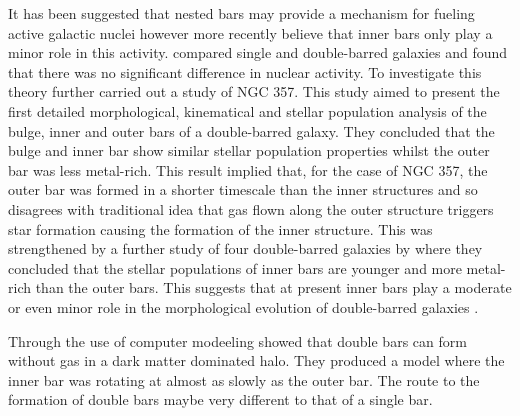 \documentclass[a4paper,12pt]{article}
\begin{document}
It has been suggested that nested bars may provide a mechanism for fueling active galactic nuclei \citep{shlosman} however more recently \citep{erwin3} believe that inner bars only play a minor role in this 
activity. \citep{erwin1} compared single and double-barred galaxies and found that there was no significant difference in nuclear activity. To investigate this theory further \cite{lorenzo1} carried out a 
study of NGC 357. This study aimed to present the first detailed morphological, kinematical and stellar population analysis of the bulge, inner and outer bars of a double-barred galaxy. They concluded that
the bulge and inner bar show similar stellar population properties whilst the outer bar was less metal-rich. This result implied that, for the case of NGC 357, the outer bar was formed in a shorter timescale than
the inner structures and so disagrees with traditional idea that gas flown along the outer structure triggers star formation causing the formation of the inner structure. This was strengthened by a further study of
four double-barred galaxies by \cite{lorenzo2} where they concluded that the stellar populations of inner bars are younger and more metal-rich than the outer bars. This suggests that at present inner bars play a
moderate or even minor role in the morphological evolution of double-barred galaxies \citep{lorenzo2}.

Through the use of computer modeeling \cite{saha} showed that double bars can form without gas in a dark matter dominated halo. They produced a model where the inner bar was rotating at almost as slowly as the 
outer bar. The route to the formation of double bars maybe very different to that of a single bar.
\end{document}
